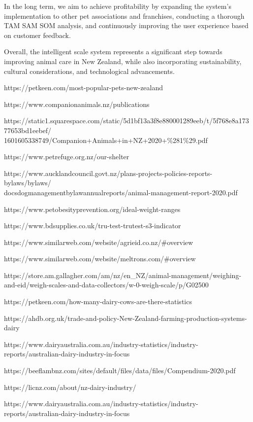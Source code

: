 In the long term, we aim to achieve profitability by expanding the system's implementation to other pet associations and franchises, conducting a thorough TAM SAM SOM analysis, and continuously improving the user experience based on customer feedback.

Overall, the intelligent scale system represents a significant step towards improving animal care in New Zealand, while also incorporating sustainability, cultural considerations, and technological advancements.

\begin{thebibliography}{00}

https://petkeen.com/most-popular-pets-new-zealand

https://www.companionanimals.nz/publications

https://static1.squarespace.com/static/5d1bf13a3f8e880001289eeb/t/5f768e8a17377653bd1eebef/\\1601605338749/Companion+Animals+in+NZ+2020+\%281\%29.pdf

https://www.petrefuge.org.nz/our-shelter

https://www.aucklandcouncil.govt.nz/plans-projects-policies-reports-bylaws/bylaws/\\docsdogmanagementbylawannualreports/animal-management-report-2020.pdf

https://www.petobesityprevention.org/ideal-weight-ranges

https://www.bdsupplies.co.uk/tru-test-trutest-s3-indicator


https://www.similarweb.com/website/agrieid.co.nz/\#overview

https://www.similarweb.com/website/meltrons.com/\#overview

https://store.am.gallagher.com/am/nz/en\_NZ/animal-management/weighing-and-eid/weigh-scales-and-data-collectors/w-0-weigh-scale/p/G02500

https://petkeen.com/how-many-dairy-cows-are-there-statistics

https://ahdb.org.uk/trade-and-policy-New-Zealand-farming-production-systems-dairy

https://www.dairyaustralia.com.au/industry-statistics/industry-reports/australian-dairy-industry-in-focus

https://beeflambnz.com/sites/default/files/data/files/Compendium-2020.pdf

https://licnz.com/about/nz-dairy-industry/

https://www.dairyaustralia.com.au/industry-statistics/industry-reports/australian-dairy-industry-in-focus

\end{thebibliography}